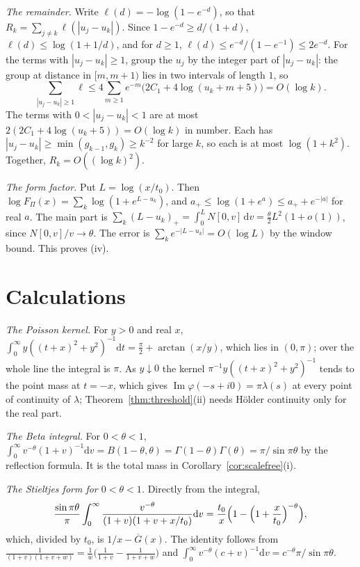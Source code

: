 \documentclass[aps,prd,twocolumn,superscriptaddress,nofootinbib,longbibliography,floatfix,amsmath,amssymb,10pt]{revtex4-2}
\theoremstyle{definition}
\theoremstyle{remark}
\newcommand{\Gbar}{\overline{G}}
\newcommand{\dd}{\mathrm{d}}
\DeclareMathOperator{\im}{Im}
\begin{document}
\emph{The remainder.} Write $\ell(d)=-\log(1-e^{-d})$, so that
$R_k=\sum_{j\ne k}\ell(|u_j-u_k|)$. Since $1-e^{-d}\ge d/(1+d)$, $\ell(d)\le
\log(1+1/d)$, and for $d\ge1$, $\ell(d)\le e^{-d}/(1-e^{-1})\le2e^{-d}$.
For the terms with $|u_j-u_k|\ge1$, group the $u_j$ by the integer part of
$|u_j-u_k|$: the group at distance in $[m,m+1)$ lies in two intervals of
length $1$, so
\[
\sum_{|u_j-u_k|\ge1}\ell\le4\sum_{m\ge1}e^{-m}\bigl(2C_1+4\log(u_k+m+5)\bigr)
=O(\log k).
\]
The terms with $0<|u_j-u_k|<1$ are at most $2(2C_1+4\log(u_k+5))=O(\log k)$
in number. Each has $|u_j-u_k|\ge\min(g_{k-1},g_k)\ge k^{-2}$ for large $k$,
so each is at most $\log(1+k^2)$. Together, $R_k=O((\log k)^2)$.

\emph{The form factor.} Put $L=\log(x/t_0)$. Then $\log F_\Pi(x)=
\sum_k\log(1+e^{L-u_k})$, and $a_+\le\log(1+e^a)\le a_++e^{-|a|}$ for real
$a$. The main part is $\sum_k(L-u_k)_+=\int_0^LN[0,v]\,\dd v=\frac\theta2
L^2(1+o(1))$, since $N[0,v]/v\to\theta$. The error is
$\sum_ke^{-|L-u_k|}=O(\log L)$ by the window bound. This proves (iv).

\section{Calculations}\label{app:calc}

\emph{The Poisson kernel.} For $y>0$ and real $x$,
$\int_0^\infty y((t+x)^2+y^2)^{-1}\dd t=\frac\pi2+\arctan(x/y)$, which lies
in $(0,\pi)$; over the whole line the integral is $\pi$. As $y\downarrow0$ the
kernel $\pi^{-1}y((t+x)^2+y^2)^{-1}$ tends to the point mass at $t=-x$, which
gives $\im\varphi(-s+i0)=\pi\lambda(s)$ at every point of continuity of
$\lambda$; Theorem~\ref{thm:threshold}(ii) needs H\"older continuity only for
the real part.

\emph{The Beta integral.} For $0<\theta<1$,
$\int_0^\infty v^{-\theta}(1+v)^{-1}\dd v=B(1-\theta,\theta)=
\Gamma(1-\theta)\Gamma(\theta)=\pi/\sin\pi\theta$ by the reflection formula.
It is the total mass in Corollary~\ref{cor:scalefree}(i).

\emph{The Stieltjes form for $0<\theta<1$.} Directly from the integral,
\[
\frac{\sin\pi\theta}{\pi}\int_0^\infty\frac{v^{-\theta}}{(1+v)(1+v+x/t_0)}
\dd v=\frac{t_0}{x}\Bigl(1-\Bigl(1+\frac x{t_0}\Bigr)^{-\theta}\Bigr),
\]
which, divided by $t_0$, is $1/x-\Gbar(x)$. The identity follows from
$\frac{1}{(1+v)(1+v+w)}=\frac1w\bigl(\frac1{1+v}-\frac1{1+v+w}\bigr)$ and
$\int_0^\infty v^{-\theta}(c+v)^{-1}\dd v=c^{-\theta}\pi/\sin\pi\theta$.
\end{document}
